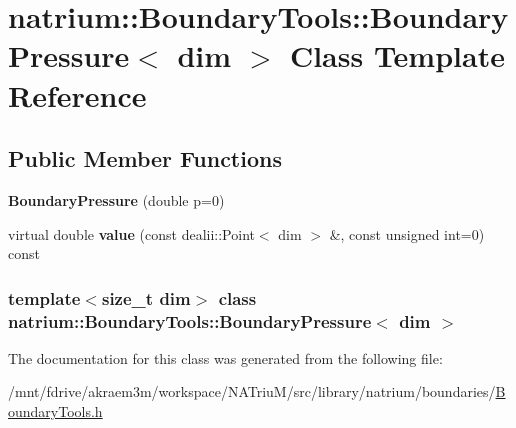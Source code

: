 \hypertarget{classnatrium_1_1BoundaryTools_1_1BoundaryPressure}{
\section{natrium::BoundaryTools::BoundaryPressure$<$ dim $>$ Class Template Reference}
\label{classnatrium_1_1BoundaryTools_1_1BoundaryPressure}
}
\subsection*{Public Member Functions}
\begin{DoxyCompactItemize}
\item 
\hypertarget{classnatrium_1_1BoundaryTools_1_1BoundaryPressure_a0fdf874222ddfd3aba68a03b35c315ba}{
{\bfseries BoundaryPressure} (double p=0)}
\label{classnatrium_1_1BoundaryTools_1_1BoundaryPressure_a0fdf874222ddfd3aba68a03b35c315ba}

\item 
\hypertarget{classnatrium_1_1BoundaryTools_1_1BoundaryPressure_a00a51886a4b67a7b529847e911cd20c9}{
virtual double {\bfseries value} (const dealii::Point$<$ dim $>$ \&, const unsigned int=0) const }
\label{classnatrium_1_1BoundaryTools_1_1BoundaryPressure_a00a51886a4b67a7b529847e911cd20c9}

\end{DoxyCompactItemize}
\subsubsection*{template$<$size\_\-t dim$>$ class natrium::BoundaryTools::BoundaryPressure$<$ dim $>$}



The documentation for this class was generated from the following file:\begin{DoxyCompactItemize}
\item 
/mnt/fdrive/akraem3m/workspace/NATriuM/src/library/natrium/boundaries/\hyperlink{BoundaryTools_8h}{BoundaryTools.h}\end{DoxyCompactItemize}
